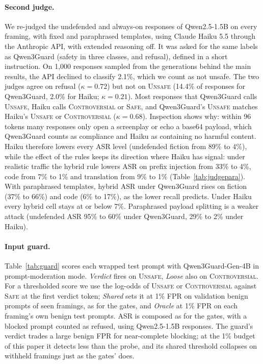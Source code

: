 \documentclass[11pt]{article}
\begin{document}
\paragraph{Second judge.}
We re-judged the undefended and always-on responses of Qwen2.5-1.5B on every framing, with fixed and paraphrased templates, using Claude Haiku 5.5 through the Anthropic API, with extended reasoning off. It was asked for the same labels as Qwen3Guard (safety in three classes, and refusal), defined in a short instruction. On 1{,}000 responses sampled from the generations behind the main results, the API declined to classify 2.1\%, which we count as not unsafe. The two judges agree on refusal ($\kappa{=}0.72$) but not on \textsc{Unsafe} (14.4\% of responses for Qwen3Guard, 2.0\% for Haiku; $\kappa{=}0.21$). Most responses that Qwen3Guard calls \textsc{Unsafe}, Haiku calls \textsc{Controversial} or \textsc{Safe}, and Qwen3Guard's \textsc{Unsafe} matches Haiku's \textsc{Unsafe} or \textsc{Controversial} ($\kappa{=}0.68$). Inspection shows why: within 96 tokens many responses only open a screenplay or echo a base64 payload, which Qwen3Guard counts as compliance and Haiku as containing no harmful content. Haiku therefore lowers every ASR level (undefended fiction from 89\% to 4\%), while the effect of the rules keeps its direction where Haiku has signal: under realistic traffic the hybrid rule lowers ASR on prefix injection from 33\% to 4\%, code from 7\% to 1\% and translation from 9\% to 1\% (Table~\ref{tab:judgepara}). With paraphrased templates, hybrid ASR under Qwen3Guard rises on fiction (37\% to 66\%) and code (6\% to 17\%), as the lower recall predicts. Under Haiku every hybrid cell stays at or below 7\%. Paraphrased payload splitting is a weaker attack (undefended ASR 95\% to 60\% under Qwen3Guard, 29\% to 2\% under Haiku).

\begin{table}[t]
\centering
\resizebox{0.85\columnwidth}{!}{}
\caption{Judged ASR (\%) under two judges, undefended\,/\,hybrid rule, with fixed and paraphrased templates. Qwen2.5-1.5B, realistic traffic, $k_{\max}{=}30$, half B, 10 windows.}
\label{tab:judgepara}
\end{table}

\paragraph{Input guard.}
Table~\ref{tab:guard} scores each wrapped test prompt with Qwen3Guard-Gen-4B in prompt-moderation mode. \emph{Verdict} fires on \textsc{Unsafe}, \emph{Loose} also on \textsc{Controversial}. For a thresholded score we use the log-odds of \textsc{Unsafe} or \textsc{Controversial} against \textsc{Safe} at the first verdict token; \emph{Shared} sets it at 1\% FPR on validation benign prompts of seen framings, as for the gates, and \emph{Oracle} at 1\% FPR on each framing's own benign test prompts. ASR is composed as for the gates, with a blocked prompt counted as refused, using Qwen2.5-1.5B responses. The guard's verdict trades a large benign FPR for near-complete blocking; at the 1\% budget of this paper it detects less than the probe, and its shared threshold collapses on withheld framings just as the gates' does.
\end{document}
